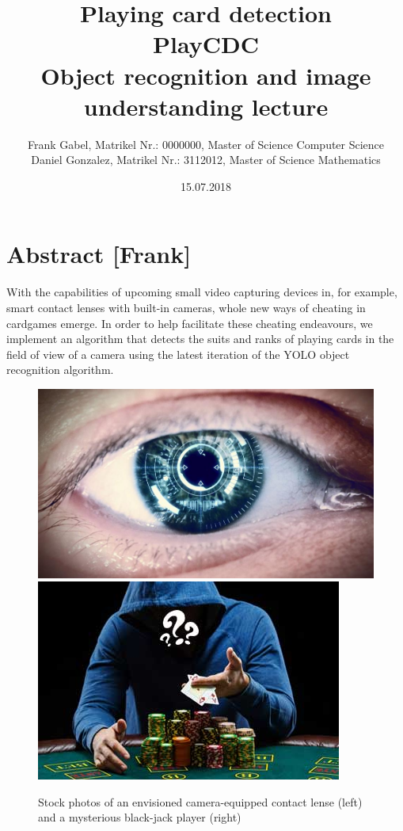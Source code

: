 \documentclass[a4paper]{article}
\title{\textbf{Playing card detection}\\ PlayCDC\\Object recognition and image understanding lecture}
\author{Frank Gabel, Matrikel Nr.: 0000000, Master of Science Computer Science \\ Daniel Gonzalez, Matrikel Nr.: 3112012, Master of Science Mathematics}
\date{15.07.2018}
\begin{document}
\maketitle
\section{Abstract [Frank]}
With the capabilities of upcoming small video capturing devices in, for example, smart contact lenses with built-in cameras, whole new ways of cheating in cardgames emerge. In order to help facilitate these cheating endeavours, we implement an algorithm that detects the suits and ranks of playing cards in the field of view of a camera using the latest iteration of the YOLO object recognition algorithm.
\begin{figure}[h]
\includegraphics[scale=0.25]{images/contact_lense}
\includegraphics[scale=0.532]{images/poker_player}
\caption{Stock photos of an envisioned camera-equipped contact lense (left) and a mysterious black-jack player (right)}
\end{figure}
\end{document}

